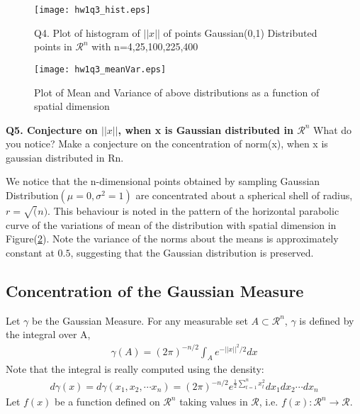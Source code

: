 \documentclass[11pt]{article}
\begin{document}
\begin{figure}[h!]
\centering
\texttt{[image: hw1q3\_hist.eps]}\\
\caption{Q4. Plot of histogram of $||x||$ of points Gaussian(0,1) Distributed points in $\mathcal{R}^n$ with n={4,25,100,225,400}}
\label{fig:que4_hist}
\end{figure}

\begin{figure}[h!]
\centering
\texttt{[image: hw1q3\_meanVar.eps]}\\
\caption{Plot of Mean and Variance of above distributions as a function of spatial dimension}
\label{fig:que5_meanVar}
\end{figure}

\textbf{Q5. Conjecture on $||x||$, when x is Gaussian distributed in $\mathcal{R}^n$}
What do you notice? Make a conjecture on the concentration of norm(x), when x is gaussian distributed in Rn.

We notice that the n-dimensional points obtained by sampling Gaussian Distribution$(\mu = 0, \sigma^2 = 1)$ are concentrated about a spherical shell of radius,$r = \sqrt(n)$. This behaviour is noted in the pattern of the horizontal parabolic curve of the variations of mean of the distribution with spatial dimension in Figure(\ref{fig:que5_meanVar}). Note the variance of the norms about the means is approximately constant at $0.5$, suggesting that the Gaussian distribution is preserved.



\hrulefill

\subsection{Concentration of the Gaussian Measure}

Let $\gamma$ be the Gaussian Measure. For any measurable set $A\subset \mathcal{R}^n$, $\gamma$ is defined by the integral over A,
\begin{align}
\gamma(A) = (2\pi)^{-n/2}\int_{A} e^{-||x||^2 /2}dx \label{eq:GaussianMeasure}
\end{align}
Note that the integral is really computed using the density:
\begin{align}
d\gamma(x) = d\gamma(x_1, x_2, \cdots x_n) = (2\pi)^{-n/2} e^{\frac{1}{2} \sum_{t=1}^n x_t^2} dx_1 dx_2 \cdots dx_n
\end{align}
Let $f(x)$ be a function defined on $\mathcal{R}^n$ taking values in $\mathcal{R}$, i.e. $f(x): \mathcal{R}^n \rightarrow \mathcal{R}$.
\end{document}
